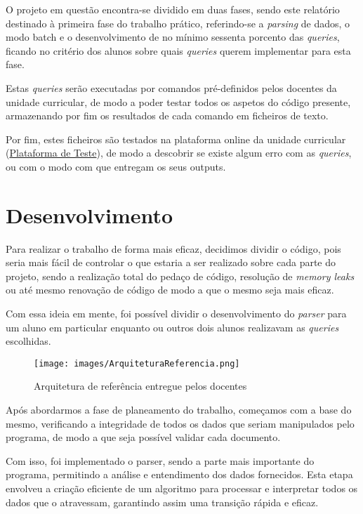 \documentclass[a4paper,12pt]{scrreprt}
\begin{document}
O projeto em questão encontra-se dividido em duas fases, sendo este relatório destinado à primeira fase do trabalho prático, referindo-se a \textit{parsing} de dados, o modo batch e o desenvolvimento de no mínimo sessenta porcento das \textit{queries}, ficando no critério dos alunos sobre quais \textit{queries} querem implementar para esta fase. 

Estas \textit{queries} serão executadas por comandos pré-definidos pelos docentes da unidade curricular, de modo a poder testar todos os aspetos do código presente, armazenando por fim os resultados de cada comando em ficheiros de texto. 

Por fim, estes ficheiros são testados na plataforma online da unidade curricular (\href{https://li3.di.uminho.pt}{Plataforma de Teste}), de modo a descobrir se existe algum erro com as \textit{queries}, ou com o modo com que entregam os seus outputs.

\chapter{Desenvolvimento}

Para realizar o trabalho de forma mais eficaz, decidimos dividir o código, pois seria mais fácil de controlar o que estaria a ser realizado sobre cada parte do projeto, sendo a realização total do pedaço de código, resolução de \textit{memory leaks} ou até mesmo renovação de código de modo a que o mesmo seja mais eficaz.

Com essa ideia em mente, foi possível dividir o desenvolvimento do \textit{parser} para um aluno em particular enquanto ou outros dois alunos realizavam as \textit{queries} escolhidas.

\begin{figure}[htb!]
        \centering
        \texttt{[image: images/ArquiteturaReferencia.png]}
        \caption{Arquitetura de referência entregue pelos docentes}
        \label{fig:my_label}
    \end{figure}

Após abordarmos a fase de planeamento do trabalho, começamos com a base do mesmo, verificando a integridade de todos os dados que seriam manipulados pelo programa, de modo a que seja possível validar cada documento.

Com isso, foi implementado o parser, sendo a parte mais importante do programa, permitindo a análise e entendimento dos dados fornecidos. Esta etapa envolveu a criação eficiente de um algoritmo para processar e interpretar todos os dados que o atravessam, garantindo assim uma transição rápida e eficaz.
\end{document}
